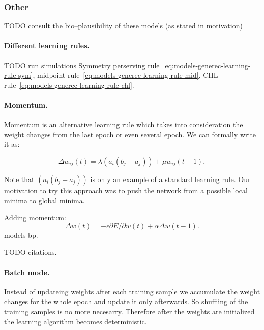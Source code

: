 
\subsubsection{Other}
TODO consult the bio--plausibility of these models (as stated in motivation) 

\paragraph{Different learning rules.}
\label{sec:our-learning-rules}

TODO run simulations 
Symmetry perserving rule~\ref{eq:models-generec-learning-rule-sym}, midpoint rule~\ref{eq:models-generec-learning-rule-mid}, CHL rule~\ref{eq:models-generec-learning-rule-chl}. 


\paragraph{Momentum.}

Momentum is an alternative learning rule which takes into consideration the weight changes from the last epoch or even several epoch. We can formally write it as: 

\begin{equation}
\Delta w_{ij}(t) = \lambda (a_i(b_j - a_j)) + \mu w_{ij}(t-1), 
\end{equation} 

Note that $(a_i(b_j - a_j))$ is only an example of a standard learning rule. Our motivation to try this approach was to push the network from a possible local minima to global minima. 

Adding momentum:
$$
\Delta w(t) = -\epsilon \partial E/ \partial w(t) + \alpha \Delta w(t-1).
$$
models-bp. 


TODO citations.  

\paragraph{Batch mode.}

Instead of updateing weights after each training sample we accumulate the weight changes for the whole epoch and update it only afterwards. So shuffling of the training samples is no more necesarry. Therefore after the weights are initialized the learning algorithm becomes deterministic.

